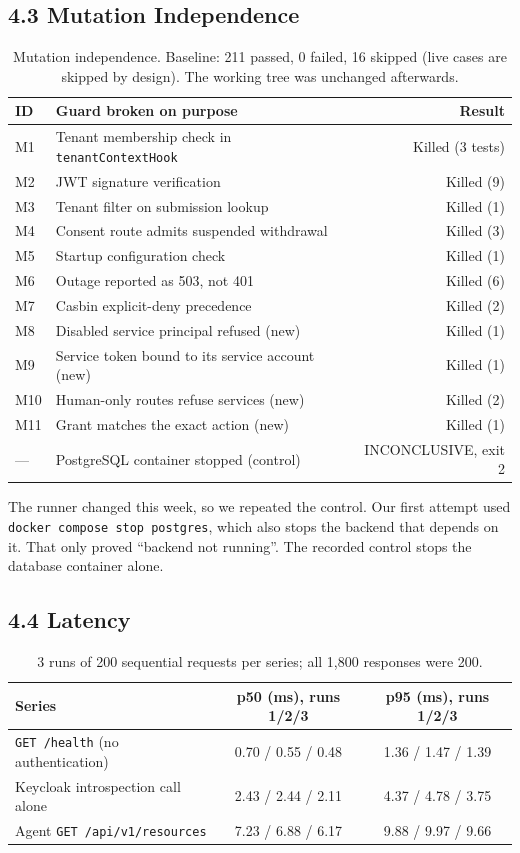 \documentclass{article}
\begin{document}
\subsection*{4.3 Mutation Independence}
\begin{table}[H]
\centering
\begin{tabular}{llr}
\toprule
\textbf{ID} & \textbf{Guard broken on purpose} & \textbf{Result} \\
\midrule
M1 & Tenant membership check in \texttt{tenantContextHook} & Killed (3 tests) \\
M2 & JWT signature verification & Killed (9) \\
M3 & Tenant filter on submission lookup & Killed (1) \\
M4 & Consent route admits suspended withdrawal & Killed (3) \\
M5 & Startup configuration check & Killed (1) \\
M6 & Outage reported as 503, not 401 & Killed (6) \\
M7 & Casbin explicit-deny precedence & Killed (2) \\
M8 & Disabled service principal refused (new) & Killed (1) \\
M9 & Service token bound to its service account (new) & Killed (1) \\
M10 & Human-only routes refuse services (new) & Killed (2) \\
M11 & Grant matches the exact action (new) & Killed (1) \\
\midrule
--- & PostgreSQL container stopped (control) & INCONCLUSIVE, exit 2 \\
\bottomrule
\end{tabular}
\caption{Mutation independence. Baseline: 211 passed, 0 failed, 16 skipped (live cases are skipped by design). The working tree was unchanged afterwards.}
\end{table}

The runner changed this week, so we repeated the control. Our first attempt used \texttt{docker compose stop postgres}, which also stops the backend that depends on it. That only proved ``backend not running''. The recorded control stops the database container alone.

\subsection*{4.4 Latency}
\begin{table}[H]
\centering
\begin{tabular}{lcc}
\toprule
\textbf{Series} & \textbf{p50 (ms), runs 1/2/3} & \textbf{p95 (ms), runs 1/2/3} \\
\midrule
\texttt{GET /health} (no authentication) & 0.70 / 0.55 / 0.48 & 1.36 / 1.47 / 1.39 \\
Keycloak introspection call alone & 2.43 / 2.44 / 2.11 & 4.37 / 4.78 / 3.75 \\
Agent \texttt{GET /api/v1/resources} & 7.23 / 6.88 / 6.17 & 9.88 / 9.97 / 9.66 \\
\bottomrule
\end{tabular}
\caption{3 runs of 200 sequential requests per series; all 1,800 responses were 200.}
\end{table}
\end{document}
